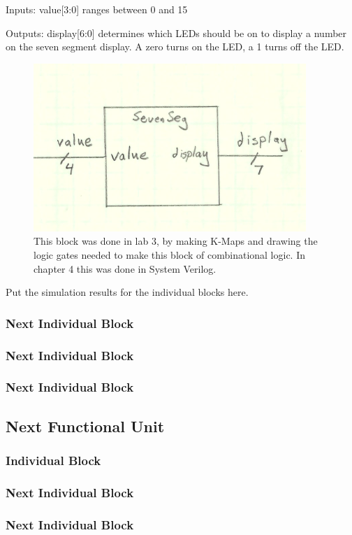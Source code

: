 \documentclass[a4paper]{article}
\begin{document}
Inputs:  value[3:0] ranges between 0 and 15

Outputs:  display[6:0] determines which LEDs should be on to display a number on the seven segment display.  A zero turns on the LED, a 1 turns off the LED.

\begin{figure}[h]
  \centering
    \includegraphics[width=.5\textwidth]{Images/IndividualBlock.png}
	\caption{This block was done in lab 3, by making K-Maps and drawing the logic gates needed to make this block of combinational logic.  In chapter 4 this was done in System Verilog.}
    \label{fig:IndBlock}
\end{figure}
\vspace{.25 in}
Put the simulation results for the individual blocks here.

\subsubsection{Next Individual Block}
\subsubsection{Next Individual Block}
\subsubsection{Next Individual Block}

\subsection{Next Functional Unit}
\subsubsection{Individual Block}
\subsubsection{Next Individual Block}
\subsubsection{Next Individual Block}
\end{document}

